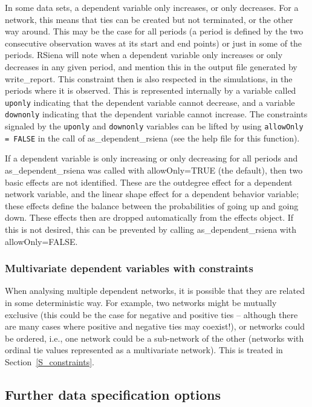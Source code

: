 \documentclass[a4paper,fleqn,11pt]{article}
\newcommand{\+}{\, + \,}
\newcommand{\sfn}[1]{\textsf{#1}}
\newcommand{\RS}{{\sf \textsf{RSiena} }}
\begin{document}
In some data sets, a dependent variable only increases, or only decreases.
For a network, this means that ties can be created but not terminated,
or the other way around.
This may be the case for all periods (a period is defined by the
two consecutive observation waves at its start and end points)
or just in some of the periods.
\RS will note when a dependent variable only increases or only decreases
in any given period,
and mention this in the output file generated by \textsf{write\_report}.
This constraint then is also respected in the simulations, in the periods
where it is observed.
This is represented
internally by a variable called \texttt{uponly} indicating that the
dependent variable cannot decrease,
and a variable \texttt{downonly} indicating that the
dependent variable cannot increase.
The constraints signaled by the  \texttt{uponly} and  \texttt{downonly}
variables can be lifted by using \texttt{allowOnly = FALSE}
in the call of \textsf{as\_dependent\_rsiena} (see the help file for this function).

If a dependent variable is only increasing or only decreasing
for all periods and \textsf{as\_dependent\_rsiena} was called with
\sfn{allowOnly=TRUE} (the default),
then two basic effects are not identified.
These are the outdegree effect for a dependent network variable,
and the linear shape effect for a dependent behavior variable;
these effects define the balance between the probabilities of
going up and going down.
These effects then are dropped automatically from the effects object.
If this is not desired, this can be prevented
by calling \textsf{as\_dependent\_rsiena} with \sfn{allowOnly=FALSE}.


\subsubsection{Multivariate dependent variables with constraints}
\label{S_constraints0}

When analysing multiple dependent networks, it is possible that they
are related in some deterministic way. For example, two networks
might be mutually exclusive (this could be the case for negative and positive
ties -- although there are many cases where positive
and negative ties may coexist!), or networks could be ordered, i.e.,
one network could be a sub-network of the other
(networks with ordinal tie values represented as a multivariate network).
This is treated in Section~\ref{S_constraints}.


\subsection{Further data specification options}
\label{S_usertrans}
\end{document}
